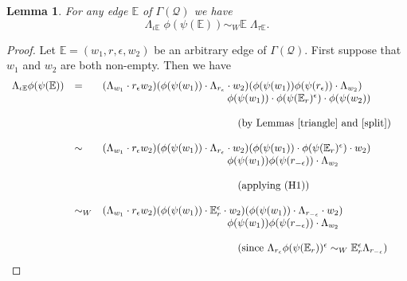 \documentclass[11pt]{amsart}
\newtheorem{lem}{Lemma}
\theoremstyle{plain}
\begin{document}
\begin{lem}\label{type1}
For any edge $\mathbb{E}$ of $\Gamma(\mathcal{Q})$ we have
\[
\Lambda_{\iota {\mathbb{E}}} \; \phi (\psi ({\mathbb{E}})) \sim_W {\mathbb{E}} \; \Lambda_{\tau {\mathbb{E}}}.
\]
\end{lem}
\begin{proof}
Let $\mathbb{E} = (w_1, r, \epsilon, w_2)$ be an arbitrary edge of $\Gamma(\mathcal{Q})$. First suppose that $w_1$ and $w_2$ are both non-empty. Then we have
\[
\begin{array}{llll}
\Lambda_{\iota {\mathbb{E}}} \phi (\psi ({\mathbb{E}})) & = & (\Lambda_{w_1}\cdot r_{\epsilon} w_2)
(\phi (\psi(w_1)) \cdot \Lambda_{r_{\epsilon}} \cdot w_2)
(\phi (\psi (w_1)) \phi (\psi (r_{\epsilon})) \cdot \Lambda_{w_2})
 & \\
 & &  \quad \quad \quad \quad  \quad \quad  \quad \quad \quad \quad \quad \quad \phi(\psi(w_1)) \cdot \phi(\psi({\mathbb{E}}_r)^{\epsilon}) \cdot \phi(\psi(w_2)) & \\
 & & &  \\
 & & \quad \quad \quad \quad   \quad \quad \quad  \quad \quad \quad \quad \quad \quad \mbox{(by Lemmas~\ref{triangle} and \ref{split})} & \\
 & & &  \\
 & \sim & (\Lambda_{w_1}\cdot r_{\epsilon} w_2)
(\phi (\psi(w_1)) \cdot \Lambda_{r_{\epsilon}} \cdot w_2)
(\phi (\psi (w_1)) \cdot \phi (\psi ({\mathbb{E}}_r)^{\epsilon}) \cdot w_2)
 & \\
 & &  \quad \quad \quad \quad  \quad \quad  \quad \quad \quad \quad \quad \quad \phi(\psi(w_1)) \phi(\psi(r_{-\epsilon})) \cdot \Lambda_{w_2} & \\
 & & &  \\
 & & \quad \quad \quad \quad   \quad \quad \quad  \quad \quad \quad \quad \quad \quad \mbox{(applying (H1))} & \\
 & & &  \\
 & \sim_W & (\Lambda_{w_1}\cdot r_{\epsilon} w_2)
(\phi (\psi(w_1)) \cdot {\mathbb{E}}_r^{\epsilon} \cdot w_2)
(\phi (\psi (w_1)) \cdot \Lambda_{r_{- \epsilon}} \cdot w_2)
 & \\
 & &  \quad \quad \quad \quad  \quad \quad  \quad \quad \quad \quad \quad \quad \phi(\psi(w_1)) \phi(\psi(r_{-\epsilon})) \cdot \Lambda_{w_2} & \\
 & & &  \\
 & & \quad \quad \quad \quad   \quad \quad \quad  \quad \quad \quad \quad \quad \quad \mbox{(since $\Lambda_{r_{\epsilon}} \phi (\psi ({\mathbb{E}}_r))^{\epsilon} \sim_W {\mathbb{E}}_r^{\epsilon} \Lambda_{r_{- \epsilon}} $)} & \\

\end{array}\]
\end{proof}
\end{document}
